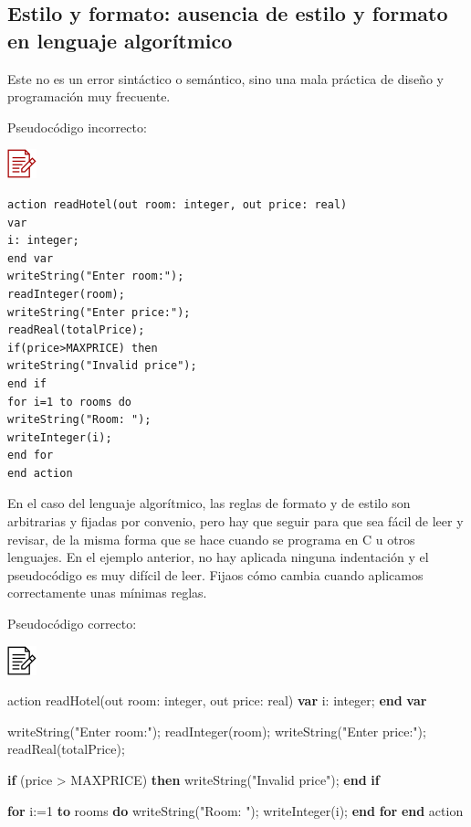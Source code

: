 \documentclass[
]{book}
\newenvironment{Shaded}{\begin{snugshade}}{\end{snugshade}}
\newcommand{\DataTypeTok}[1]{\textcolor[rgb]{0.13,0.29,0.53}{#1}}
\newcommand{\DecValTok}[1]{\textcolor[rgb]{0.00,0.00,0.81}{#1}}
\newcommand{\KeywordTok}[1]{\textcolor[rgb]{0.13,0.29,0.53}{\textbf{#1}}}
\newcommand{\NormalTok}[1]{#1}
\begin{document}
\hypertarget{estilo-y-formato-ausencia-de-estilo-y-formato-en-lenguaje-algoruxedtmico}{%
\subsection{Estilo y formato: ausencia de estilo y formato en lenguaje algorítmico}\label{estilo-y-formato-ausencia-de-estilo-y-formato-en-lenguaje-algoruxedtmico}}

Este no es un error sintáctico o semántico, sino una mala práctica de diseño y programación muy frecuente.

Pseudocódigo incorrecto:

\includegraphics{./img/alg_err.png}

\begin{verbatim}
action readHotel(out room: integer, out price: real)
var
i: integer;
end var
writeString("Enter room:");
readInteger(room);
writeString("Enter price:");
readReal(totalPrice);
if(price>MAXPRICE) then
writeString("Invalid price");
end if
for i=1 to rooms do
writeString("Room: ");
writeInteger(i);
end for
end action
\end{verbatim}

En el caso del lenguaje algorítmico, las reglas de formato y de estilo son arbitrarias y fijadas por convenio, pero hay que seguir para que sea fácil de leer y revisar, de la misma forma que se hace cuando se programa en C u otros lenguajes. En el ejemplo anterior, no hay aplicada ninguna indentación y el pseudocódigo es muy difícil de leer. Fijaos cómo cambia cuando aplicamos correctamente unas mínimas reglas.

Pseudocódigo correcto:

\includegraphics{./img/alg.png}

\begin{Shaded}
\begin{Highlighting}[]
\NormalTok{action readHotel(out room: }\DataTypeTok{integer}\NormalTok{, out price: }\DataTypeTok{real}\NormalTok{)}
    \KeywordTok{var}
\NormalTok{        i: }\DataTypeTok{integer}\NormalTok{;}
    \KeywordTok{end} \KeywordTok{var}
    
\NormalTok{    writeString("Enter room:");}
\NormalTok{    readInteger(room);}
\NormalTok{    writeString("Enter price:");}
\NormalTok{    readReal(totalPrice);}
    
    \KeywordTok{if}\NormalTok{ (price \textgreater{} MAXPRICE) }\KeywordTok{then}
\NormalTok{        writeString("Invalid price");}
    \KeywordTok{end} \KeywordTok{if}
    
    \KeywordTok{for}\NormalTok{ i:=}\DecValTok{1} \KeywordTok{to}\NormalTok{ rooms }\KeywordTok{do}
\NormalTok{        writeString("Room: ");}
\NormalTok{    writeInteger(i);}
    \KeywordTok{end} \KeywordTok{for}
\KeywordTok{end}\NormalTok{ action}
\end{Highlighting}
\end{Shaded}
\end{document}
